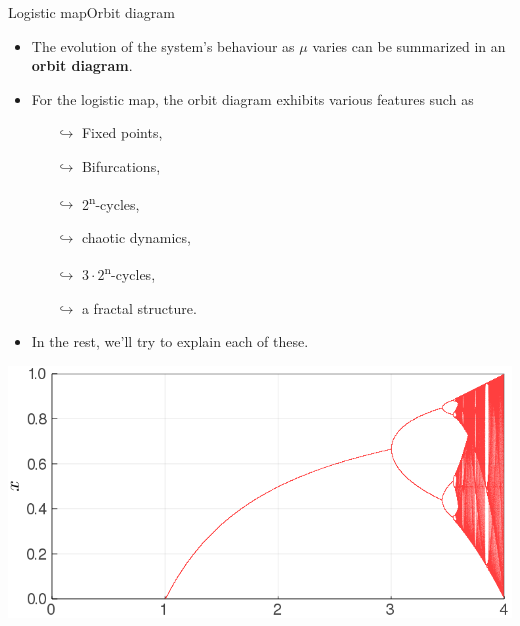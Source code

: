 \documentclass[usenames,dvipsnames,svgnames,10pt,aspectratio=169]{beamer}
\begin{document}
\begin{frame}[t, c]{Logistic map}{Orbit diagram}
	\begin{minipage}{.48\textwidth}
		\begin{itemize}
			\item The evolution of the system's behaviour as \( \mu \) varies can be summarized in an \textbf{orbit diagram}.

			\medskip

			\item For the logistic map, the orbit diagram exhibits various features such as
			\begin{itemize}
				\item[\( \hookrightarrow \)] Fixed points,
				\item[\( \hookrightarrow \)] Bifurcations,
				\item[\( \hookrightarrow \)] 2\textsuperscript{n}-cycles,
				\item[\( \hookrightarrow \)] chaotic dynamics,
				\item[\( \hookrightarrow \)] \(3 \cdot 2\)\textsuperscript{n}-cycles,
				\item[\( \hookrightarrow \)] a fractal structure.
			\end{itemize}

			\medskip

			\item In the rest, we'll try to explain each of these.
		\end{itemize}
	\end{minipage}%
	\hfill
	\begin{minipage}{.48\textwidth}
		\centering
		\includegraphics[width=\textwidth]{orbit_diagram_a}
	\end{minipage}

	\vspace{1cm}
\end{frame}
\end{document}
